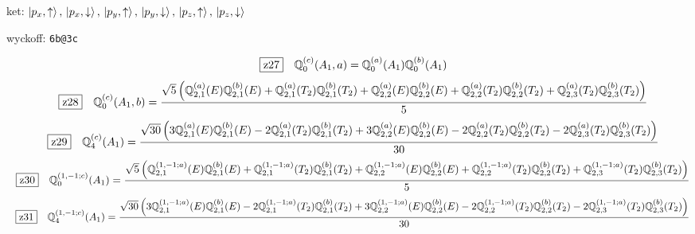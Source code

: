 \documentclass[fleqn,10pt,landscape]{jsarticle}
\begin{document}
\noindent\quad * ket: $\ket{p_{x},\uparrow},\, \ket{p_{x},\downarrow},\, \ket{p_{y},\uparrow},\, \ket{p_{y},\downarrow},\, \ket{p_{z},\uparrow},\, \ket{p_{z},\downarrow}$

\noindent\quad * wyckoff: \texttt{6b@3c}

\begin{dmath*}
\hspace*{3mm}\fbox{z27}\quad \mathbb{Q}_{0}^{(c)}(A_{1},a)=\mathbb{Q}_{0}^{(a)}(A_{1}) \mathbb{Q}_{0}^{(b)}(A_{1})
\end{dmath*}
\begin{dmath*}
\hspace*{3mm}\fbox{z28}\quad \mathbb{Q}_{0}^{(c)}(A_{1},b)=\frac{\sqrt{5} \left(\mathbb{Q}_{2,1}^{(a)}(E) \mathbb{Q}_{2,1}^{(b)}(E) + \mathbb{Q}_{2,1}^{(a)}(T_{2}) \mathbb{Q}_{2,1}^{(b)}(T_{2}) + \mathbb{Q}_{2,2}^{(a)}(E) \mathbb{Q}_{2,2}^{(b)}(E) + \mathbb{Q}_{2,2}^{(a)}(T_{2}) \mathbb{Q}_{2,2}^{(b)}(T_{2}) + \mathbb{Q}_{2,3}^{(a)}(T_{2}) \mathbb{Q}_{2,3}^{(b)}(T_{2})\right)}{5}
\end{dmath*}
\begin{dmath*}
\hspace*{3mm}\fbox{z29}\quad \mathbb{Q}_{4}^{(c)}(A_{1})=\frac{\sqrt{30} \left(3 \mathbb{Q}_{2,1}^{(a)}(E) \mathbb{Q}_{2,1}^{(b)}(E) - 2 \mathbb{Q}_{2,1}^{(a)}(T_{2}) \mathbb{Q}_{2,1}^{(b)}(T_{2}) + 3 \mathbb{Q}_{2,2}^{(a)}(E) \mathbb{Q}_{2,2}^{(b)}(E) - 2 \mathbb{Q}_{2,2}^{(a)}(T_{2}) \mathbb{Q}_{2,2}^{(b)}(T_{2}) - 2 \mathbb{Q}_{2,3}^{(a)}(T_{2}) \mathbb{Q}_{2,3}^{(b)}(T_{2})\right)}{30}
\end{dmath*}
\begin{dmath*}
\hspace*{3mm}\fbox{z30}\quad \mathbb{Q}_{0}^{(1,-1;c)}(A_{1})=\frac{\sqrt{5} \left(\mathbb{Q}_{2,1}^{(1,-1;a)}(E) \mathbb{Q}_{2,1}^{(b)}(E) + \mathbb{Q}_{2,1}^{(1,-1;a)}(T_{2}) \mathbb{Q}_{2,1}^{(b)}(T_{2}) + \mathbb{Q}_{2,2}^{(1,-1;a)}(E) \mathbb{Q}_{2,2}^{(b)}(E) + \mathbb{Q}_{2,2}^{(1,-1;a)}(T_{2}) \mathbb{Q}_{2,2}^{(b)}(T_{2}) + \mathbb{Q}_{2,3}^{(1,-1;a)}(T_{2}) \mathbb{Q}_{2,3}^{(b)}(T_{2})\right)}{5}
\end{dmath*}
\begin{dmath*}
\hspace*{3mm}\fbox{z31}\quad \mathbb{Q}_{4}^{(1,-1;c)}(A_{1})=\frac{\sqrt{30} \left(3 \mathbb{Q}_{2,1}^{(1,-1;a)}(E) \mathbb{Q}_{2,1}^{(b)}(E) - 2 \mathbb{Q}_{2,1}^{(1,-1;a)}(T_{2}) \mathbb{Q}_{2,1}^{(b)}(T_{2}) + 3 \mathbb{Q}_{2,2}^{(1,-1;a)}(E) \mathbb{Q}_{2,2}^{(b)}(E) - 2 \mathbb{Q}_{2,2}^{(1,-1;a)}(T_{2}) \mathbb{Q}_{2,2}^{(b)}(T_{2}) - 2 \mathbb{Q}_{2,3}^{(1,-1;a)}(T_{2}) \mathbb{Q}_{2,3}^{(b)}(T_{2})\right)}{30}
\end{dmath*}
\end{document}
